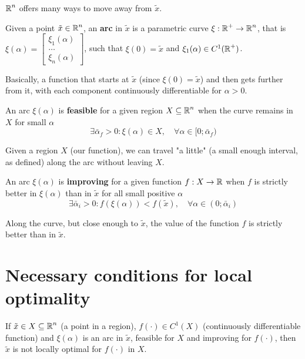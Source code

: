 $\operatorname{\mathbb{R}}^n$ offers many ways to move away from $\tilde x$.\\

\begin{definition}
	Given a point $\tilde x \in \operatorname{\mathbb{R}}^n$, an \textbf{arc} in $\tilde x$ is a parametric curve $\xi: \operatorname{\mathbb{R}}^+ \rightarrow \operatorname{\mathbb{R}}^n$, that is $\xi (\alpha) = \left[\begin{array}{c}
		\xi_1 (\alpha) \\ \dots \\ \xi_n (\alpha)
	\end{array}\right]$, such that $\xi (0) = \tilde x$ and $\xi_1 (\alpha) \in C^1 (\operatorname{\mathbb{R}}^+)$.
\end{definition}

Basically, a function that starts at $\tilde x$ (since $\xi (0) = \tilde x$) and then gets further from it, with each component continuously differentiable for $\alpha > 0$. \\

\begin{definition}
	An arc $\xi (\alpha)$ is \textbf{feasible} for a given region $X \subseteq \operatorname{\mathbb{R}}^n$ when the curve remains in $X$ for small $\alpha$
	$$ \exists \bar \alpha_f > 0 : \xi (\alpha) \in X, \quad \forall \alpha \in [0; \bar \alpha_f) $$
\end{definition}

Given a region $X$ (our function), we can travel "a little" (a small enough interval, as defined) along the arc without leaving $X$. \\

\begin{definition}
	An arc $\xi (\alpha)$ is \textbf{improving} for a given function $f:X \rightarrow \operatorname{\mathbb{R}}$ when $f$ is strictly better in $\xi (\alpha)$ than in $\tilde x$ for all small positive $\alpha$
	$$ \exists \bar \alpha_i > 0 : f\left(\xi(\alpha)\right) < f (\tilde x), \quad \forall \alpha \in (0; \bar \alpha_i) $$
\end{definition}

Along the curve, but close enough to $\tilde x$, the value of the function $f$ is strictly better than in $\tilde x$.

\section{Necessary conditions for local optimality}
\label{sec:necforlocal}

\begin{theo}
	If $\tilde x \in X \subseteq \operatorname{\mathbb{R}}^n$ (a point in a region), $f(\cdot) \in C^1 (X)$ (continuously differentiable function) and $\xi (\alpha)$ is an arc in $\tilde x$, feasible for $X$ and improving for $f(\cdot)$, then $\tilde x$ is not locally optimal for $f(\cdot)$ in $X$.
\end{theo}

